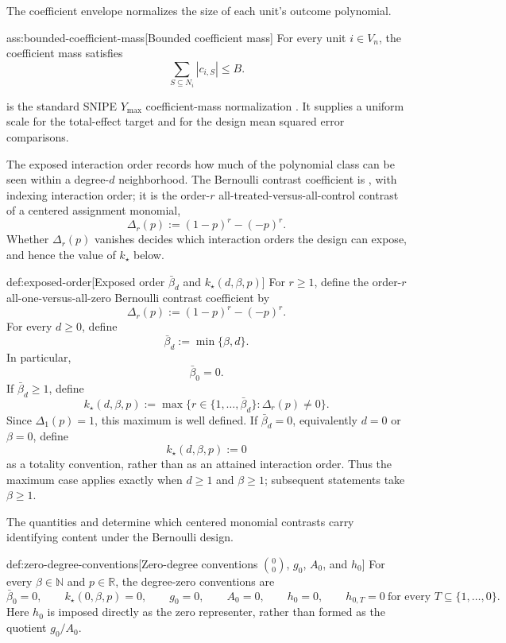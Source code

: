 The coefficient envelope  normalizes the size of each unit's outcome polynomial.

\begin{assumptionv}{ass:bounded-coefficient-mass}[Bounded coefficient mass]
For every unit \(i\in V_n\), the coefficient mass satisfies
\[
\sum_{S\subseteq N_i}|c_{i,S}|\le B .
\]
\end{assumptionv}

 is the standard SNIPE \(Y_{\max}\) coefficient-mass normalization \citep{CortezRodriguezEichhornYu2023}. It supplies a uniform scale for the total-effect target and for the design mean squared error comparisons.

The exposed interaction order records how much of the polynomial class can be seen within a degree-\(d\) neighborhood. The Bernoulli contrast coefficient is , with  indexing interaction order; it is the order-\(r\) all-treated-versus-all-control contrast of a centered assignment monomial,
\[
\Delta_r(p):=(1-p)^r-(-p)^r .
\]
Whether \(\Delta_r(p)\) vanishes decides which interaction orders the design can expose, and hence the value of \(k_\star\) below.

\begin{definitionv}{def:exposed-order}[Exposed order \(\bar\beta_d\) and \(k_\star(d,\beta,p)\)]
For \(r\ge1\), define the order-\(r\) all-one-versus-all-zero Bernoulli contrast coefficient by
\[
\Delta_r(p):=(1-p)^r-(-p)^r .
\]
For every \(d\ge0\), define
\[
\bar\beta_d:=\min\{\beta,d\}.
\]
In particular,
\[
\bar\beta_0=0 .
\]
If \(\bar\beta_d\ge1\), define
\[
k_\star(d,\beta,p)
:=
\max\bigl\{r\in\{1,\ldots,\bar\beta_d\}:\Delta_r(p)\ne0\bigr\}.
\]
Since \(\Delta_1(p)=1\), this maximum is well defined. If \(\bar\beta_d=0\), equivalently \(d=0\) or \(\beta=0\), define
\[
k_\star(d,\beta,p):=0
\]
as a totality convention, rather than as an attained interaction order. Thus the maximum case applies exactly when \(d\ge1\) and \(\beta\ge1\); subsequent statements take \(\beta\ge1\).
\end{definitionv}

The quantities  and  determine which centered monomial contrasts carry identifying content under the Bernoulli design.

\begin{definitionv}{def:zero-degree-conventions}[Zero-degree conventions \(\binom{0}{0}\), \(g_0\), \(A_0\), and \(h_0\)]
For every \(\beta\in\mathbb N\) and \(p\in\mathbb R\), the degree-zero conventions are
\[
\bar\beta_0=0,
\qquad
k_\star(0,\beta,p)=0,
\qquad
g_0=0,
\qquad
A_0=0,
\qquad
h_0=0,
\qquad
h_{0,T}=0\ \text{for every }T\subseteq\{1,\ldots,0\}.
\]
Here \(h_0\) is imposed directly as the zero representer, rather than formed as the quotient \(g_0/A_0\).
\end{definitionv}

